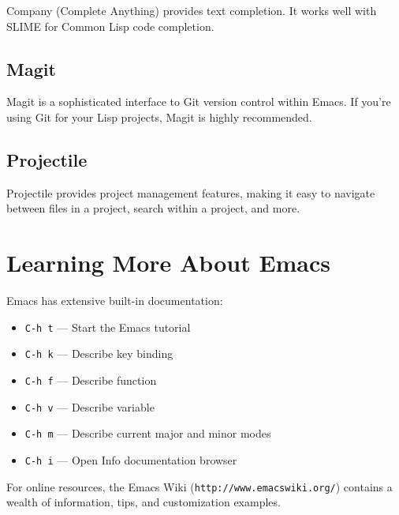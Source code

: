 Company (Complete Anything) provides text completion. It works well with SLIME for
Common Lisp code completion.

\subsection{Magit}

Magit is a sophisticated interface to Git version control within Emacs. If you're using Git
for your Lisp projects, Magit is highly recommended.

\subsection{Projectile}

Projectile provides project management features, making it easy to navigate between files in
a project, search within a project, and more.

\section{Learning More About Emacs}

Emacs has extensive built-in documentation:

\begin{itemize}
\item \texttt{C-h t} --- Start the Emacs tutorial
\item \texttt{C-h k} --- Describe key binding
\item \texttt{C-h f} --- Describe function
\item \texttt{C-h v} --- Describe variable
\item \texttt{C-h m} --- Describe current major and minor modes
\item \texttt{C-h i} --- Open Info documentation browser
\end{itemize}

For online resources, the Emacs Wiki (\texttt{http://www.emacswiki.org/}) contains a wealth
of information, tips, and customization examples.
